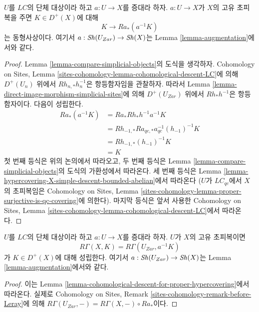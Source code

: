 \begin{lemma}
\label{lemma-cohomological-descent-for-proper-hypercovering}
$U$를 $\textit{LC}$의 단체 대상이라 하고 $a : U \to X$를 증대라 하자.
$a : U \to X$가 $X$의 고유 초피복을 주면 $K \in D^+(X)$에 대해
$$
K \to Ra_*(a^{-1}K)
$$
는 동형사상이다. 여기서 $a : \mathop{\mathit{Sh}}\nolimits(U_{Zar}) \to \mathop{\mathit{Sh}}\nolimits(X)$는 Lemma
\ref{lemma-augmentation}에서와 같다.
\end{lemma}

\begin{proof}
Lemma \ref{lemma-compare-simplicial-objects}의 도식을 생각하자.
Cohomology on Sites, Lemma
\ref{sites-cohomology-lemma-cohomological-descent-LC}에 의해
$D^+(U_n)$ 위에서 $Rh_{n, *}h_n^{-1}$은 항등함자임을 관찰하자.
따라서 Lemma \ref{lemma-direct-image-morphism-simplicial-sites}에 의해
$D^+(U_{Zar})$ 위에서 $Rh_*h^{-1}$은 항등함자이다. 다음이 성립한다.
\begin{align*}
Ra_*(a^{-1}K)
& =
Ra_*Rh_*h^{-1}a^{-1}K \\
& =
Rh_{-1, *}Ra_{qc, *}a_{qc}^{-1}(h_{-1})^{-1}K \\
& =
Rh_{-1, *}(h_{-1})^{-1}K \\
& =
K
\end{align*}
첫 번째 등식은 위의 논의에서 따라오고, 두 번째 등식은 Lemma
\ref{lemma-compare-simplicial-objects}의 도식의 가환성에서 따라온다.
세 번째 등식은 Lemma
\ref{lemma-hypercovering-X-simple-descent-bounded-abelian}에서 따라온다
($U$가 $\textit{LC}_{qc}$에서 $X$의 초피복임은 Cohomology on Sites,
Lemma \ref{sites-cohomology-lemma-proper-surjective-is-qc-covering}에 의한다).
마지막 등식은 앞서 사용한 Cohomology on Sites, Lemma
\ref{sites-cohomology-lemma-cohomological-descent-LC}에서 따라온다.
\end{proof}

\begin{lemma}
\label{lemma-compute-via-proper-hypercovering}
$U$를 $\textit{LC}$의 단체 대상이라 하고 $a : U \to X$를 증대라 하자.
$U$가 $X$의 고유 초피복이면
$$
R\Gamma(X, K) = R\Gamma(U_{Zar}, a^{-1}K)
$$
가 $K \in D^+(X)$에 대해 성립한다. 여기서
$a : \mathop{\mathit{Sh}}\nolimits(U_{Zar}) \to \mathop{\mathit{Sh}}\nolimits(X)$는 Lemma \ref{lemma-augmentation}에서와 같다.
\end{lemma}

\begin{proof}
이는 Lemma \ref{lemma-cohomological-descent-for-proper-hypercovering}에서
따라온다. 실제로 Cohomology on Sites, Remark
\ref{sites-cohomology-remark-before-Leray}에 의해
$R\Gamma(U_{Zar}, -) = R\Gamma(X, -) \circ Ra_*$이다.
\end{proof}

